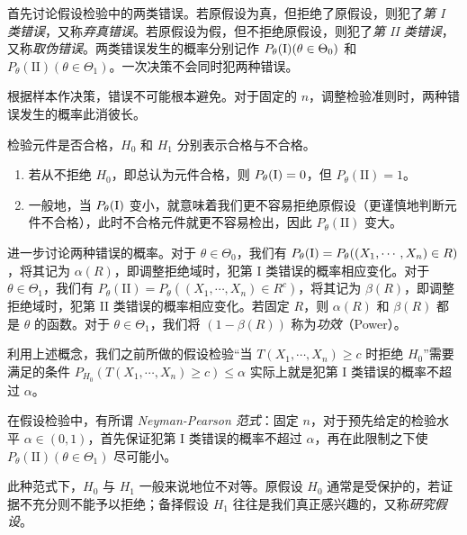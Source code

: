 \documentclass[../main.tex]{subfiles}
\begin{document}
首先讨论假设检验中的两类错误。若原假设为真，但拒绝了原假设，则犯了\emph{第 I 类错误}，又称\emph{弃真错误}。若原假设为假，但不拒绝原假设，则犯了\emph{第 II 类错误}，又称\emph{取伪错误}。两类错误发生的概率分别记作 $P_\theta(\text I)(\theta\in\Theta_0)$ 和 $P_\theta(\text{II})(\theta\in\Theta_1)$。一次决策不会同时犯两种错误。

根据样本作决策，错误不可能根本避免。对于固定的 $n$，调整检验准则时，两种错误发生的概率此消彼长。

\begin{example}
    检验元件是否合格，$H_0$ 和 $H_1$ 分别表示合格与不合格。
    \begin{enumerate}
        \item 若从不拒绝 $H_0$，即总认为元件合格，则 $P_\theta(\text I)=0$，但 $P_\theta(\text{II})=1$。
        \item 一般地，当 $P_\theta(\text I)$ 变小，就意味着我们更不容易拒绝原假设（更谨慎地判断元件不合格），此时不合格元件就更不容易检出，因此 $P_\theta(\text{II})$ 变大。
    \end{enumerate}
\end{example}

进一步讨论两种错误的概率。对于 $\theta\in\Theta_0$，我们有 $P_\theta(\text I)=P_\theta((X_1,\cdots,X_n)\in R)$，将其记为 $\alpha(R)$，即调整拒绝域时，犯第 I 类错误的概率相应变化。对于 $\theta\in\Theta_1$，我们有 $P_\theta(\text{II})=P_\theta((X_1,\cdots,X_n)\in R^c)$，将其记为 $\beta(R)$，即调整拒绝域时，犯第 II 类错误的概率相应变化。若固定 $R$，则 $\alpha(R)$ 和 $\beta(R)$ 都是 $\theta$ 的函数。对于 $\theta\in\Theta_1$，我们将 $(1-\beta(R))$ 称为\emph{功效}（Power）。

利用上述概念，我们之前所做的假设检验“当 $T(X_1,\cdots,X_n)\geq c$ 时拒绝 $H_0$”需要满足的条件 $P_{H_0}(T(X_1,\cdots,X_n)\geq c)\leq\alpha$ 实际上就是犯第 I 类错误的概率不超过 $\alpha$。

在假设检验中，有所谓 \emph{Neyman-Pearson 范式}：固定 $n$，对于预先给定的检验水平 $\alpha\in(0,1)$，首先保证犯第 I 类错误的概率不超过 $\alpha$，再在此限制之下使 $P_\theta(\text{II})(\theta\in\Theta_1)$ 尽可能小。

此种范式下，$H_0$ 与 $H_1$ 一般来说地位不对等。原假设 $H_0$ 通常是受保护的，若证据不充分则不能予以拒绝；备择假设 $H_1$ 往往是我们真正感兴趣的，又称\emph{研究假设}。
\end{document}
